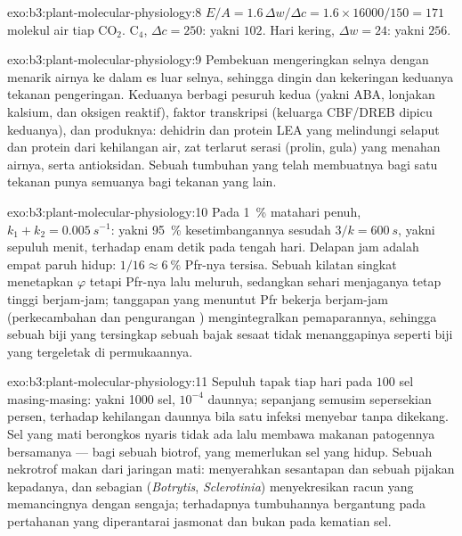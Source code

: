 \begin{solution}{exo:b3:plant-molecular-physiology:8}
$E/A = 1.6\,\Delta w/\Delta c = 1.6\times\num{16000}/150 = 171$ molekul
air tiap CO$_{2}$. C$_{4}$, $\Delta c = 250$: yakni $102$. Hari kering,
$\Delta w = 24$: yakni $256$.
\end{solution}

\begin{solution}{exo:b3:plant-molecular-physiology:9}
Pembekuan mengeringkan selnya dengan menarik airnya ke dalam es luar selnya, sehingga
dingin dan kekeringan keduanya tekanan pengeringan. Keduanya berbagi pesuruh
kedua (yakni ABA, lonjakan kalsium, dan oksigen reaktif), faktor
transkripsi (keluarga CBF/DREB dipicu keduanya), dan produknya:
dehidrin dan protein LEA yang melindungi selaput dan protein dari
kehilangan air, zat terlarut serasi (prolin, gula) yang menahan airnya, serta
antioksidan. Sebuah tumbuhan yang telah membuatnya bagi satu tekanan punya semuanya bagi
tekanan yang lain.
\end{solution}

\begin{solution}{exo:b3:plant-molecular-physiology:10}
Pada \qty{1}{\%} matahari penuh, $k_{1} + k_{2} = \qty{0.005}{s^{-1}}$: yakni 95~\%
kesetimbangannya sesudah $3/k = \qty{600}{s}$, yakni sepuluh menit, terhadap enam
detik pada tengah hari. Delapan jam adalah empat paruh hidup: $1/16 \approx
\qty{6}{\%}$ Pfr-nya tersisa. Sebuah kilatan singkat menetapkan $\varphi$ tetapi
Pfr-nya lalu meluruh, sedangkan sehari menjaganya tetap tinggi berjam-jam; tanggapan
yang menuntut Pfr bekerja berjam-jam (perkecambahan dan pengurangan )
mengintegralkan pemaparannya, sehingga sebuah biji yang tersingkap sebuah bajak sesaat tidak menanggapinya
seperti biji yang tergeletak di permukaannya.
\end{solution}

\begin{solution}{exo:b3:plant-molecular-physiology:11}
Sepuluh tapak tiap hari pada $100$ sel masing-masing: yakni \num{1000} sel, $10^{-4}$
daunnya; sepanjang semusim sepersekian persen, terhadap kehilangan
daunnya bila satu infeksi menyebar tanpa dikekang. Sel yang mati berongkos nyaris
tidak ada lalu membawa makanan patogennya bersamanya --- bagi sebuah biotrof,
yang memerlukan sel yang hidup. Sebuah nekrotrof makan dari jaringan mati:
 menyerahkan sesantapan dan sebuah pijakan kepadanya, dan sebagian
(\emph{Botrytis}, \emph{Sclerotinia}) menyekresikan racun yang memancingnya
dengan sengaja; terhadapnya tumbuhannya bergantung pada pertahanan yang diperantarai jasmonat
dan bukan pada kematian sel.
\end{solution}

